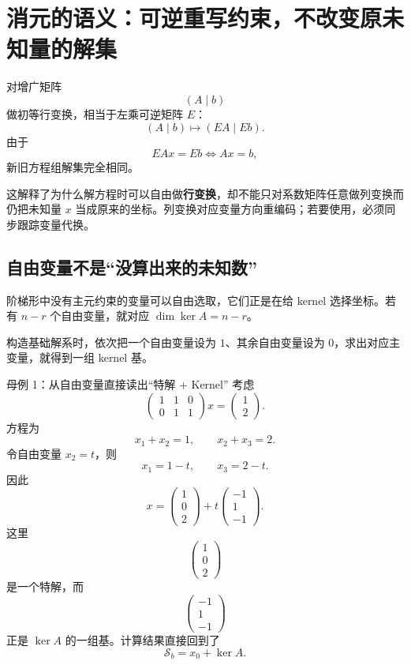 \documentclass[11pt,a4paper]{ctexart}
\newcommand{\kw}[1]{\textbf{\color{deep}#1}}
\begin{document}
\section{消元的语义：可逆重写约束，不改变原未知量的解集}

对增广矩阵
\[
(A\mid b)
\]
做初等行变换，相当于左乘可逆矩阵 $E$：
\[
(A\mid b)\mapsto(EA\mid Eb).
\]
由于
\[
EAx=Eb
\iff
Ax=b,
\]
新旧方程组解集完全相同。

这解释了为什么解方程时可以自由做\kw{行变换}，却不能只对系数矩阵任意做列变换而仍把未知量 $x$ 当成原来的坐标。列变换对应变量方向重编码；若要使用，必须同步跟踪变量代换。

\subsection{自由变量不是“没算出来的未知数”}

阶梯形中没有主元约束的变量可以自由选取，它们正是在给 kernel 选择坐标。若有 $n-r$ 个自由变量，就对应 $\dim\ker A=n-r$。

构造基础解系时，依次把一个自由变量设为 $1$、其余自由变量设为 $0$，求出对应主变量，就得到一组 kernel 基。

\begin{examplebox}{母例 1：从自由变量直接读出“特解 + Kernel”}
考虑
\[
\begin{pmatrix}
1&1&0\\
0&1&1
\end{pmatrix}x
=
\begin{pmatrix}1\\2\end{pmatrix}.
\]
方程为
\[
x_1+x_2=1,
\qquad
x_2+x_3=2.
\]
令自由变量 $x_2=t$，则
\[
x_1=1-t,
\qquad
x_3=2-t.
\]
因此
\[
x=
\begin{pmatrix}1\\0\\2\end{pmatrix}
+t
\begin{pmatrix}-1\\1\\-1\end{pmatrix}.
\]
这里
\[
\begin{pmatrix}1\\0\\2\end{pmatrix}
\]
是一个特解，而
\[
\begin{pmatrix}-1\\1\\-1\end{pmatrix}
\]
正是 $\ker A$ 的一组基。计算结果直接回到了
\[
\mathcal S_b=x_0+\ker A.
\]
\end{examplebox}
\end{document}
